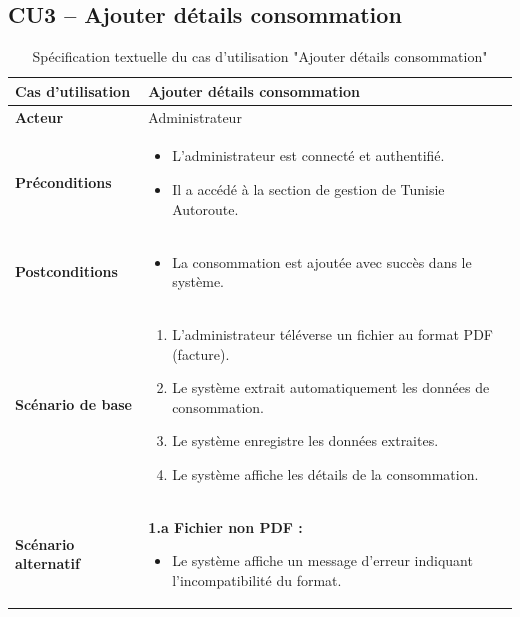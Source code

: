 \documentclass[a4paper,11pt]{report}
\begin{document}
\subsection*{CU3 – Ajouter détails consommation}
\begin{table}[H]
  \centering
  \renewcommand{\arraystretch}{1.5}
  \caption{Spécification textuelle du cas d'utilisation "Ajouter détails consommation"}
  \begin{tabularx}{\textwidth}{|l|X|}
    \hline
    \textbf{Cas d'utilisation} & Ajouter détails consommation \\ \hline
    \textbf{Acteur}            & Administrateur \\ \hline
    \textbf{Préconditions}     & 
      \begin{itemize}
        \item L’administrateur est connecté et authentifié.
        \item Il a accédé à la section de gestion de Tunisie Autoroute.
      \end{itemize} \\ \hline
    \textbf{Postconditions}    & 
      \begin{itemize}
        \item La consommation est ajoutée avec succès dans le système.
      \end{itemize} \\ \hline
    \textbf{Scénario de base}  & 
      \begin{enumerate}
        \item L’administrateur téléverse un fichier au format PDF (facture).
        \item Le système extrait automatiquement les données de consommation.
        \item Le système enregistre les données extraites.
        \item Le système affiche les détails de la consommation.
      \end{enumerate} \\ \hline
    \textbf{Scénario alternatif} & 
      \textbf{1.a Fichier non PDF :}
      \begin{itemize}
        \item Le système affiche un message d’erreur indiquant l’incompatibilité du format.
      \end{itemize} \\ \hline
  \end{tabularx}
\end{table}
\end{document}
